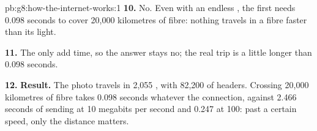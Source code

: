 \begin{solution}{pb:g8:how-the-internet-works:1}
\textbf{10.} No. Even with an endless , the first  needs 0.098
seconds to cover 20,000 kilometres of fibre: nothing travels in a fibre
faster than its light.

\textbf{11.} The  only add time, so the answer stays no; the real trip
is a little longer than 0.098 seconds.

\textbf{12.} \textbf{Result.} The photo travels in 2,055 , with 82,200
 of headers. Crossing 20,000 kilometres of fibre takes 0.098 seconds
whatever the connection, against 2.466 seconds of sending at 10 megabits per
second and 0.247 at 100: past a certain speed, only the distance matters.
\end{solution}

